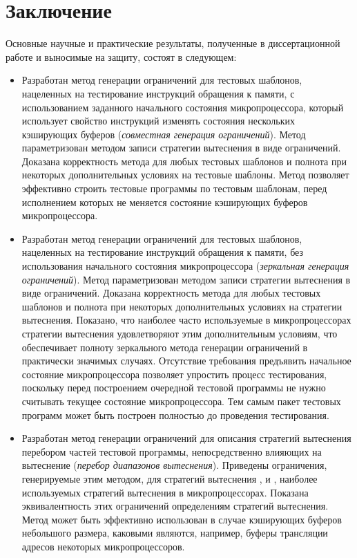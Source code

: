 \chapter*{Заключение}

Основные научные и практические результаты, полученные в
диссертационной работе и выносимые на защиту, состоят в следующем:

\begin{itemize}
  \item Разработан метод генерации ограничений для тестовых
шаблонов, нацеленных на тестирование инструкций обращения к памяти,
с использованием заданного начального состояния микропроцессора,
который использует свойство инструкций изменять состояния нескольких
кэширующих буферов (\emph{совместная генерация ограничений}). Метод
параметризован методом записи стратегии вытеснения в виде
ограничений. Доказана корректность метода для любых тестовых
шаблонов и полнота при некоторых дополнительных условиях на тестовые
шаблоны. Метод позволяет эффективно строить тестовые программы по
тестовым шаблонам, перед исполнением которых не меняется состояние
кэширующих буферов микропроцессора.

  \item Разработан метод генерации ограничений для тестовых
шаблонов, нацеленных на тестирование инструкций обращения к памяти,
без использования начального состояния микропроцессора
(\emph{зеркальная генерация ограничений}). Метод параметризован
методом записи стратегии вытеснения в виде ограничений. Доказана
корректность метода для любых тестовых шаблонов и полнота при
некоторых дополнительных условиях на стратегии вытеснения. Показано,
что наиболее часто используемые в микропроцессорах стратегии
вытеснения удовлетворяют этим дополнительным условиям, что
обеспечивает полноту зеркального метода генерации ограничений в
практически значимых случаях. Отсутствие требования предъявить
начальное состояние микропроцессора позволяет упростить процесс
тестирования, поскольку перед построением очередной тестовой
программы не нужно считывать текущее состояние микропроцессора. Тем
самым пакет тестовых программ может быть построен полностью до
проведения тестирования.

  \item Разработан метод генерации ограничений для описания
  стратегий вытеснения перебором частей тестовой программы,
  непосредственно влияющих на вытеснение (\emph{перебор диапазонов
  вытеснения}). Приведены ограничения, генерируемые этим методом,
  для стратегий вытеснения \LRU, \FIFO и \PseudoLRU, наиболее
  используемых стратегий вытеснения в микропроцессорах. Показана
  эквивалентность этих ограничений определениям стратегий
  вытеснения. Метод может быть эффективно использован в случае
  кэширующих буферов небольшого размера, каковыми являются,
  например, буферы трансляции адресов некоторых микропроцессоров.


\end{itemize}
